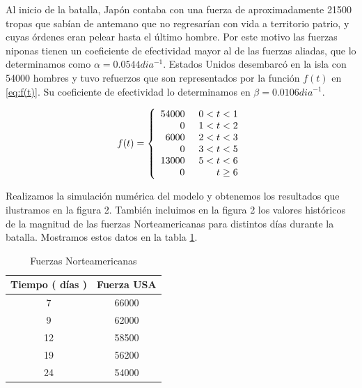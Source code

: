\documentclass[10pt,journal,compsoc]{IEEEtran}
\begin{document}
\indent Al inicio de la batalla, Jap\'on contaba con una fuerza de aproximadamente 21500 tropas que sab\'ian de antemano que no 
regresar\'ian con vida a territorio patrio, y cuyas \'ordenes eran pelear hasta el \'ultimo hombre. 
Por este motivo las fuerzas niponas tienen un coeficiente de efectividad mayor
al de las fuerzas aliadas, que lo determinamos como $ \alpha = 0.0544 dia^{-1}$. Estados Unidos desembarc\'o en
 la isla con 54000 hombres y tuvo refuerzos  que son
representados por la funci\'on $f(t)$ en \ref{eq:f(t)}. Su coeficiente de efectividad lo determinamos 
en $\beta = 0.0106dia^{-1}$.

\begin{equation}
\label{eq:f(t)}
f(t) = \left\{
 \begin{array}{rl}
  54000 \hspace{0.5cm} 0 < t < 1\\
   0 \hspace{0.5cm} 1 < t < 2\\
   6000 \hspace{0.5cm} 2 < t < 3\\
  0 \hspace{0.5cm} 3 < t < 5\\
13000 \hspace{0.5cm} 5 < t < 6\\
 0 \hspace{1.15cm} t \geq 6\\
 \end{array} \right.
\end{equation}

\indent Realizamos la simulaci\'on num\'erica del modelo y obtenemos los resultados que ilustramos
en la figura 2. Tambi\'en incluimos en la figura 2 los valores hist\'oricos de la magnitud de las fuerzas Norteamericanas
para distintos d\'ias durante la batalla. Mostramos estos datos en la tabla \ref{tab:sim}.

%
\begin{table}[!t]
\renewcommand{\arraystretch}{1.3}
\caption{Fuerzas Norteamericanas}
\centering
\begin{tabular}{c c}
\hline
\hline
Tiempo ( d\'ias ) & Fuerza USA\\
\hline
7 &  66000\\
9 & 62000 \\
12 & 58500 \\
19 & 56200  \\
24 & 54000 \\
\hline
\hline
\end{tabular}
\label{tab:sim}
\end{table}
\end{document}
